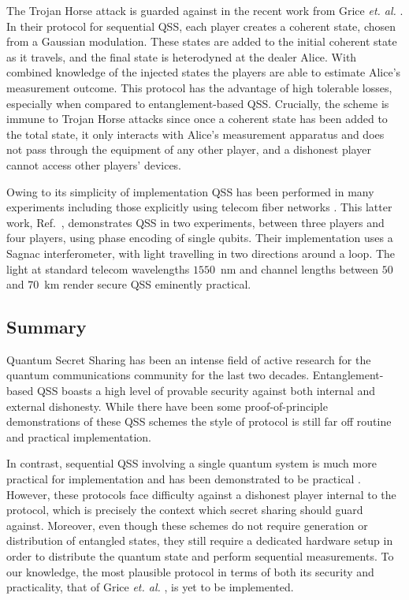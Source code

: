 The Trojan Horse attack is guarded against in the recent work from Grice \emph{et. al.} \cite{Grice2019}. In their protocol for sequential QSS, each player creates a coherent state, chosen from a Gaussian modulation. These states are added to the initial coherent state as it travels, and the final state is heterodyned at the dealer Alice. With combined knowledge of the injected states the players are able to estimate Alice's measurement outcome. This protocol has the advantage of high tolerable losses, especially when compared to entanglement-based QSS. Crucially, the scheme is immune to Trojan Horse attacks since once a coherent state has been added to the total state, it only interacts with Alice's measurement apparatus and does not pass through the equipment of any other player, and a dishonest player cannot access other players' devices.

Owing to its simplicity of implementation QSS has been performed in many experiments \cite{Schmid2005, Hai-Qiang2013a} including those explicitly using telecom fiber networks \cite{Bogdanski2009}. This latter work, Ref.~\cite{Bogdanski2009}, demonstrates QSS in two experiments, between three players and four players, using phase encoding of single qubits. Their implementation uses a Sagnac interferometer, with light travelling in two directions around a loop. The light at standard telecom wavelengths $1550$~nm and channel lengths between $50$ and $70$~km render secure QSS eminently practical.



\subsection{Summary}
Quantum Secret Sharing has been an intense field of active research for the quantum communications community for the last two decades. Entanglement-based QSS boasts a high level of provable security against both internal and external dishonesty. While there have been some proof-of-principle demonstrations of these QSS schemes \cite{Gartner2007, Bell2014, Tittel2001, Chen2005b} the style of protocol is still far off routine and practical implementation.

In contrast, sequential QSS involving a single quantum system is much more practical for implementation and has been demonstrated to be practical \cite{Schmid2005, Bogdanski2009, Hai-Qiang2013a}. However, these protocols face difficulty against a dishonest player internal to the protocol, which is precisely the context which secret sharing should guard against. Moreover, even though these schemes do not require generation or distribution of entangled states, they still require a dedicated hardware setup in order to distribute the quantum state and perform sequential measurements. To our knowledge, the most plausible protocol in terms of both its security and practicality, that of Grice \emph{et. al.} \cite{Grice2019}, is yet to be implemented. 

